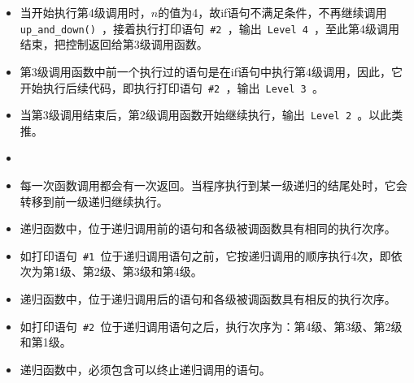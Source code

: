 \begin{frame}[fragile]
\begin{itemize}
\item 当开始执行第4级调用时，$n$的值为4，故if语句不满足条件，不再继续调用\lstinline| up_and_down() |，接着执行打印语句\lstinline| #2 |，输出\lstinline| Level 4 |，至此第4级调用结束，把控制返回给第3级调用函数。\\[0.1in]
\item 第3级调用函数中前一个执行过的语句是在if语句中执行第4级调用，因此，它开始执行后续代码，即执行打印语句\lstinline| #2 |，输出\lstinline| Level 3 |。\\[0.1in]
\item 当第3级调用结束后，第2级调用函数开始继续执行，输出\lstinline| Level 2 |。以此类推。
\end{itemize}
\end{frame}

\begin{frame}[fragile]
\begin{itemize}
\item
{}\\[0.1in]
\item
每一次函数调用都会有一次返回。当程序执行到某一级递归的结尾处时，它会转移到前一级递归继续执行。
\end{itemize}
\end{frame}

\begin{frame}[fragile]
\begin{itemize}
\item
递归函数中，位于递归调用前的语句和各级被调函数具有相同的执行次序。\\[0.1in]
\item[] 如打印语句\lstinline| #1 |位于递归调用语句之前，它按递归调用的顺序执行4次，即依次为第1级、第2级、第3级和第4级。\\[0.1in]
\item 
递归函数中，位于递归调用后的语句和各级被调函数具有相反的执行次序。\\[0.1in]
\item[] 
如打印语句\lstinline| #2 |位于递归调用语句之后，执行次序为：第4级、第3级、第2级和第1级。
\end{itemize}
\end{frame}

\begin{frame}[fragile]
\begin{itemize}
\item 递归函数中，必须包含可以终止递归调用的语句。
\end{itemize}

\end{frame}

